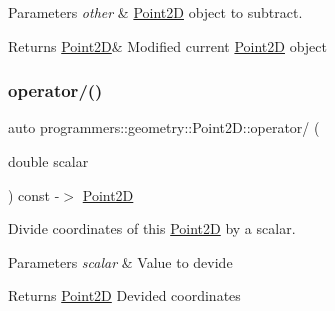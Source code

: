 \begin{DoxyParams}{Parameters}
{\em other} & \hyperlink{classprogrammers_1_1geometry_1_1Point2D}{Point2D} object to subtract. \\
\hline
\end{DoxyParams}
\begin{DoxyReturn}{Returns}
\hyperlink{classprogrammers_1_1geometry_1_1Point2D}{Point2D}\& Modified current \hyperlink{classprogrammers_1_1geometry_1_1Point2D}{Point2D} object 
\end{DoxyReturn}
\mbox{\label{classprogrammers_1_1geometry_1_1Point2D_ad7cccfc72a15a6ff83cc583752d28dd4}} 
\subsubsection{\texorpdfstring{operator/()}{operator/()}}
{\footnotesize\ttfamily auto programmers\+::geometry\+::\+Point2\+D\+::operator/ (\begin{DoxyParamCaption}\item[{double}]{scalar }\end{DoxyParamCaption}) const -\/$>$  \hyperlink{classprogrammers_1_1geometry_1_1Point2D}{Point2D}}



Divide coordinates of this \hyperlink{classprogrammers_1_1geometry_1_1Point2D}{Point2D} by a scalar. 


\begin{DoxyParams}{Parameters}
{\em scalar} & Value to devide \\
\hline
\end{DoxyParams}
\begin{DoxyReturn}{Returns}
\hyperlink{classprogrammers_1_1geometry_1_1Point2D}{Point2D} Devided coordinates 
\end{DoxyReturn}
\mbox{\label{classprogrammers_1_1geometry_1_1Point2D_a1ccae7f5bd4db986140bf7566f3939c5}} 
